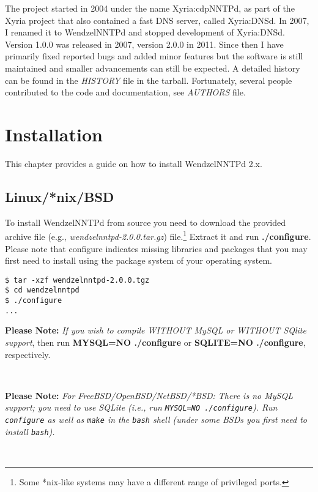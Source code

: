 \documentclass[12pt,fleqn,leqno]{scrbook}
\begin{document}
The project started in 2004 under the name Xyria:cdpNNTPd, as part of
the Xyria project that also contained a fast DNS server, called
Xyria:DNSd. In 2007, I renamed it to WendzelNNTPd and stopped
development of Xyria:DNSd. Version 1.0.0 was released in 2007, version
2.0.0 in 2011. Since then I have primarily fixed reported bugs and added
minor features but the software is still maintained and smaller
advancements can still be expected. A detailed history can be found in
the \emph{HISTORY} file in the tarball. Fortunately, several people
contributed to the code and documentation, see \emph{AUTHORS} file.

\hypertarget{installation}{%
\section{Installation}\label{installation}}

This chapter provides a guide on how to install WendzelNNTPd 2.x.

\hypertarget{linuxnixbsd}{%
\subsection{Linux/*nix/BSD}\label{linuxnixbsd}}

To install WendzelNNTPd from source you need to download the provided
archive file (e.g., \emph{wendzelnntpd-2.0.0.tar.gz}) file.\footnote{Some
  *nix-like systems may have a different range of privileged ports.}
Extract it and run \textbf{./configure}. Please note that configure
indicates missing libraries and packages that you may first need to
install using the package system of your operating system.

\begin{verbatim}
$ tar -xzf wendzelnntpd-2.0.0.tgz
$ cd wendzelnntpd
$ ./configure
...
\end{verbatim}

\textbf{Please Note:} \emph{If you wish to compile WITHOUT MySQL or
WITHOUT SQlite support}, then run \textbf{MYSQL=NO ./configure} or
\textbf{SQLITE=NO ./configure}, respectively.

~

\textbf{Please Note:} \emph{For FreeBSD/OpenBSD/NetBSD/*BSD: There is no
MySQL support; you need to use SQLite (i.e., run
\texttt{MYSQL=NO\ ./configure}). Run \texttt{configure} as well as
\texttt{make} in the \texttt{bash} shell (under some BSDs you first need
to install \texttt{bash}).}

~
\end{document}
